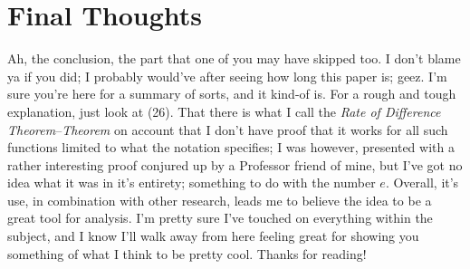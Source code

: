 \documentclass[12pt, letterpaper]{report}
\begin{document}
\section*{Final Thoughts}
\hspace{0.5cm}Ah, the conclusion, the part that one of you may have skipped too. I don't blame ya if you did; I probably would've after seeing how long this paper is; geez. I'm sure you're here for a summary of sorts, and it kind-of is. For a rough and tough explanation, just look at (26). That there is what I call the \textit{Rate of Difference Theorem}--\textit{Theorem} on account that I don't have proof that it works for all such functions limited to what the notation specifies; I was however, presented with a rather interesting proof conjured up by a Professor friend of mine, but I've got no idea what it was in it's entirety; something to do with the number $e$. Overall, it's use, in combination with other research, leads me to believe the idea to be a great tool for analysis. I'm pretty sure I've touched on everything within the subject, and I know I'll walk away from here feeling great for showing you something of what I think to be\hspace{0.1cm} pretty\hspace{0.1cm} cool. Thanks for reading!

	
\end{document}
